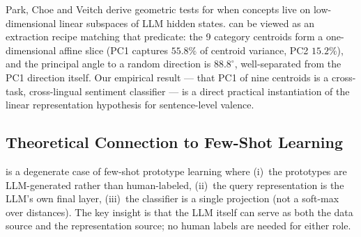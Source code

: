 Park, Choe and Veitch \cite{park2024linear} derive geometric tests for
when concepts live on low-dimensional linear subspaces of LLM hidden
states. \ours{} can be viewed as an extraction recipe matching that
predicate: the 9 category centroids form a one-dimensional affine
slice (PC1 captures $55.8\%$ of centroid variance, PC2 $15.2\%$),
and the principal angle to a random direction is $88.8^\circ$,
well-separated from the PC1 direction itself. Our empirical result ---
that PC1 of nine centroids is a cross-task, cross-lingual sentiment
classifier --- is a direct practical instantiation of the linear
representation hypothesis for sentence-level valence.

\subsection{Theoretical Connection to Few-Shot Learning}

\ours{} is a degenerate case of few-shot prototype learning
\cite{snell2017prototypical} where (i)~the prototypes are LLM-generated
rather than human-labeled, (ii)~the query representation is the LLM's own
final layer, (iii)~the classifier is a single projection (not a soft-max
over distances). The key insight is that the LLM itself can serve as both
the data source and the representation source; no human labels are needed
for either role.
